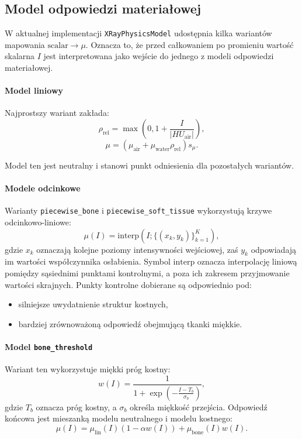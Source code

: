 \documentclass[11pt,a4paper]{article}
\begin{document}
\subsection{Model odpowiedzi materiałowej}

W aktualnej implementacji \texttt{XRayPhysicsModel} udostępnia kilka wariantów
mapowania \(\mathrm{scalar}\to\mu\). Oznacza to, że przed całkowaniem po promieniu
wartość skalarna \(I\) jest interpretowana jako wejście do jednego z modeli
odpowiedzi materiałowej.

\paragraph{Model liniowy}
Najprostszy wariant zakłada:
\[
  \rho_{\mathrm{rel}} = \max\!\left(0,1+\frac{I}{|HU_{\mathrm{air}}|}\right),
\]
\[
  \mu =
  \left(\mu_{\mathrm{air}}+\mu_{\mathrm{water}}\rho_{\mathrm{rel}}\right)s_{\mu}.
\]

Model ten jest neutralny i stanowi punkt odniesienia dla pozostałych wariantów.

\paragraph{Modele odcinkowe}
Warianty \texttt{piecewise\_bone} i \texttt{piecewise\_soft\_tissue} wykorzystują
krzywe odcinkowo-liniowe:
\[
  \mu(I)=\mathrm{interp}(I;\{(x_k,y_k)\}_{k=1}^{K}),
\]
gdzie \(x_k\) oznaczają kolejne poziomy intensywności wejściowej, zaś \(y_k\)
odpowiadają im wartości współczynnika osłabienia. Symbol \(\mathrm{interp}\)
oznacza interpolację liniową pomiędzy sąsiednimi punktami kontrolnymi, a poza
ich zakresem przyjmowanie wartości skrajnych. Punkty kontrolne dobierane są odpowiednio pod:
\begin{itemize}
\item silniejsze uwydatnienie struktur kostnych,
\item bardziej zrównoważoną odpowiedź obejmującą tkanki miękkie.
\end{itemize}

\paragraph{Model \texttt{bone\_threshold}}
Wariant ten wykorzystuje miękki próg kostny:
\[
  w(I)=\frac{1}{1+\exp\!\left(-\frac{I-T_b}{\sigma_b}\right)},
\]
gdzie \(T_b\) oznacza próg kostny, a \(\sigma_b\) określa miękkość przejścia.
Odpowiedź końcowa jest mieszanką modelu neutralnego i modelu kostnego:
\[
  \mu(I)=
  \mu_{\mathrm{lin}}(I)\left(1-\alpha w(I)\right)
  +
  \mu_{\mathrm{bone}}(I)w(I).
\]
\end{document}

